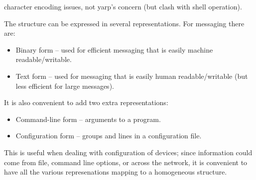 character encoding issues, not yarp's concern (but clash with shell 
operation).


The structure
can be expressed in several representations.  For messaging there are:

\begin{itemize} \pflist

\item Binary form -- used for efficient messaging that is
easily machine readable/writable.

\item Text form -- used for messaging that is easily human
readable/writable (but less efficient for large messages).

\end{itemize}

It is also convenient to add two extra representations:

\begin{itemize} \pflist

\item Command-line form -- arguments to a program.

\item Configuration form -- groups and lines in a configuration file.

\end{itemize}

This is useful when dealing with configuration of devices; since
information could come from file, command line options, or across the
network, it is convenient to have all the various represenations
mapping to a homogeneous structure.








